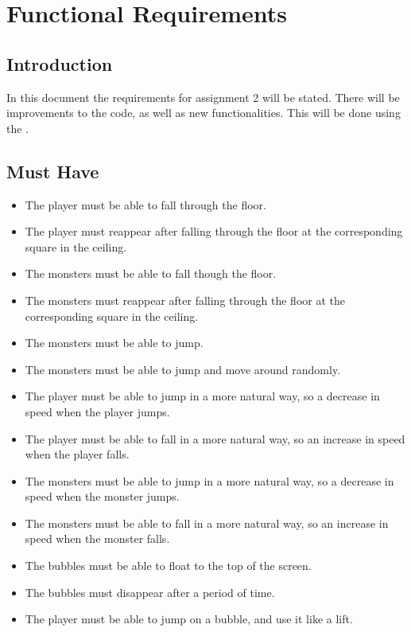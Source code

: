 \chapter{Functional Requirements}

\section{Introduction}
In this document the requirements for assignment 2 will be stated. There will be improvements to the code, as well as new functionalities. \noindent This will be done using the .

\section{Must Have}
\begin{itemize}
\itemsep0em
\item The player must be able to fall through the floor.
\item The player must reappear after falling through the floor at the corresponding square in the ceiling.
\item The monsters must be able to fall though the floor.
\item The monsters must reappear after falling through the floor at the corresponding square in the ceiling.
\item The monsters must be able to jump.
\item The monsters must be able to jump and move around randomly.
\item The player must be able to jump in a more natural way, so a decrease in speed when the player jumps.
\item The player must be able to fall in a more natural way, so an increase in speed when the player falls.
\item The monsters must be able to jump in a more natural way, so a decrease in speed when the monster jumps.
\item The monsters must be able to fall in a more natural way, so an increase in speed when the monster falls.
\item The bubbles must be able to float to the top of the screen.
\item The bubbles must disappear after a period of time.
\item The player must be able to jump on a bubble, and use it like a lift.
\end{itemize}

